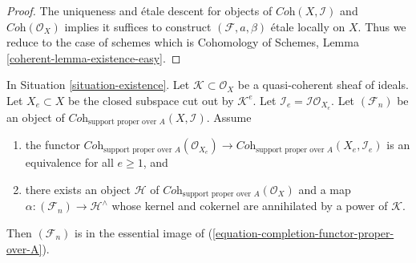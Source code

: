 \begin{proof}
The uniqueness and \'etale descent for objects of
$\textit{Coh}(X, \mathcal{I})$ and $\textit{Coh}(\mathcal{O}_X)$
implies it suffices to construct $(\mathcal{F}, a, \beta)$ \'etale
locally on $X$. Thus we reduce to the case of schemes which is
Cohomology of Schemes, Lemma \ref{coherent-lemma-existence-easy}.
\end{proof}

\begin{lemma}
\label{lemma-existence-tricky}
In Situation \ref{situation-existence}. Let $\mathcal{K} \subset \mathcal{O}_X$
be a quasi-coherent sheaf of ideals. Let $X_e \subset X$ be the closed subspace
cut out by $\mathcal{K}^e$. Let $\mathcal{I}_e = \mathcal{I}\mathcal{O}_{X_e}$.
Let $(\mathcal{F}_n)$ be an object of
$\textit{Coh}_{\text{support proper over } A}(X, \mathcal{I})$.
Assume
\begin{enumerate}
\item the functor
$\textit{Coh}_{\text{support proper over } A}(\mathcal{O}_{X_e})
\to \textit{Coh}_{\text{support proper over } A}(X_e, \mathcal{I}_e)$
is an equivalence for all $e \geq 1$, and
\item there exists an object $\mathcal{H}$ of
$\textit{Coh}_{\text{support proper over } A}(\mathcal{O}_X)$ and a map
$\alpha : (\mathcal{F}_n) \to \mathcal{H}^\wedge$ whose
kernel and cokernel are annihilated by a power of $\mathcal{K}$.
\end{enumerate}
Then $(\mathcal{F}_n)$ is in the essential image of
(\ref{equation-completion-functor-proper-over-A}).
\end{lemma}

